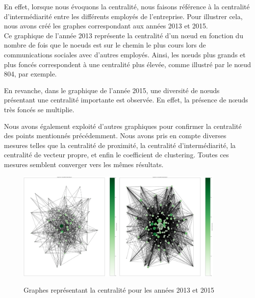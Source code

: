\documentclass{article}
\begin{document}
En effet, lorsque nous évoquons la centralité, nous faisons référence à la centralité d'intermédiarité entre les différents employés de l'entreprise. Pour illustrer cela, nous avons créé les graphes correspondant aux années 2013 et 2015. \\

Ce graphique de l'année 2013 représente la centralité d'un nœud en fonction du nombre de fois que le noeuds est sur le chemin le plus cours lors de communications sociales avec d'autres employés. Ainsi, les nœuds plus grands et plus foncés correspondent à une centralité plus élevée, comme illustré par le nœud 804, par exemple.

En revanche, dans le graphique de l'année 2015, une diversité de nœuds présentant une centralité importante est observée. En effet, la présence de nœuds très foncés se multiplie.

Nous avons également exploité d'autres graphiques pour confirmer la centralité des points mentionnés précédemment. Nous avons pris en compte diverses mesures telles que la centralité de proximité, la centralité d'intermédiarité, la centralité de vecteur propre, et enfin le coefficient de clustering. Toutes ces mesures semblent converger vers les mêmes résultats.

\begin{figure}[!h]
    \centering
    \includegraphics[width=0.45\textwidth]{assets/centralite/between_centralite_2013.png}
    \hfill
    \includegraphics[width=0.45\textwidth]{assets/centralite/between_centralite_2015.png}
    \caption{Graphes représentant la centralité pour les années 2013 et 2015}
    \label{fig:deg_centralite_parallel}
\end{figure}
\end{document}
